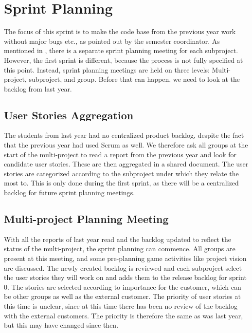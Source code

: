 \chapter{Sprint Planning}\label{chap:sprint1_planning}
The focus of this sprint is to make the code base from the previous year work without major bugs etc., as pointed out by the semester coordinator. As mentioned in , there is a separate sprint planning meeting for each subproject. However, the first sprint is different, because the process is not fully specified at this point. Instead, sprint planning meetings are held on three levels: Multi-project, subproject, and group. Before that can happen, we need to look at the backlog from last year.

\section{User Stories Aggregation}
The students from last year had no centralized product backlog, despite the fact that the previous year had used Scrum as well. We therefore ask all groups at the start of the multi-project to read a report from the previous year and look for candidate user stories. These are then aggregated in a shared document. The user stories are categorized according to the subproject under which they relate the most to. This is only done during the first sprint, as there will be a centralized backlog for future sprint planning meetings.

\section{Multi-project Planning Meeting}
With all the reports of last year read and the backlog updated to reflect the status of the multi-project, the sprint planning can commence. All groups are present at this meeting, and some pre-planning game activities like project vision are discussed. The newly created backlog is reviewed and each subproject select the user stories they will work on and adds them to the release backlog for sprint 0. The stories are selected according to importance for the customer, which can be other groups as well as the external customer. The priority of user stories at this time is unclear, since at this time there has been no review of the backlog with the external customers. The priority is therefore the same as was last year, but this may have changed since then.

